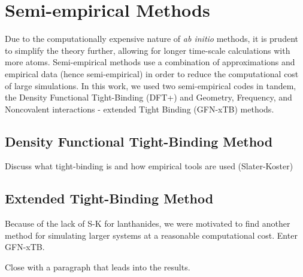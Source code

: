 \section{Semi-empirical Methods}

Due to the computationally expensive nature of \textit{ab initio} methods, it is prudent to simplify the theory further, allowing for longer time-scale calculations with more atoms. Semi-empirical methods use a combination of approximations and empirical data (hence semi-empirical) in order to reduce the computational cost of large simulations. In this work, we used two semi-empirical codes in tandem, the Density Functional Tight-Binding (DFT+) and  Geometry, Frequency, and Noncovalent interactions - extended Tight Binding (GFN-xTB) methods\autocite{hourahine2020dftb,grimmeRobustEfficientGeneral2017}.

\subsection{Density Functional Tight-Binding Method}

Discuss what tight-binding is and how empirical tools are used (Slater-Koster)

\autocite{elstnerSelfconsistentchargeDensityfunctionalTightbinding1998} %
\autocite{hourahine2020dftb} %

\subsection{Extended Tight-Binding Method}

Because of the lack of S-K for lanthanides, we were motivated to find another method for simulating larger systems at a reasonable computational cost. Enter GFN-xTB.
\autocite{grimmeRobustEfficientGeneral2017} %
\autocite{bannwarthGFN2xTBAnAccurateBroadly2019} %
\autocite{bannwarthExtendedTightbindingQuantum2021} %

Close with a paragraph that leads into the results.

\clearpage